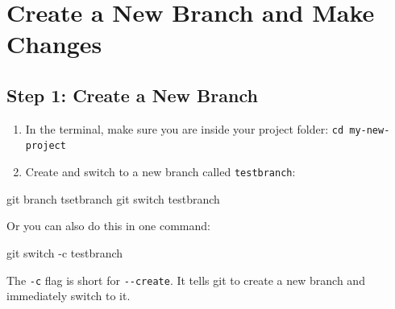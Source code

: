 \documentclass[
  11pt,
  letterpaper,
  DIV=11,
  numbers=noendperiod]{scrartcl}
\newenvironment{Shaded}{\begin{snugshade}}{\end{snugshade}}
\newcommand{\AttributeTok}[1]{\textcolor[rgb]{0.40,0.45,0.13}{#1}}
\newcommand{\FunctionTok}[1]{\textcolor[rgb]{0.28,0.35,0.67}{#1}}
\newcommand{\NormalTok}[1]{\textcolor[rgb]{0.00,0.23,0.31}{#1}}
\providecommand{\tightlist}{%
  \setlength{\itemsep}{0pt}\setlength{\parskip}{0pt}}\usepackage{longtable,booktabs,array}
\let\textttOrig\texttt
\renewcommand{\texttt}[1]{\textttOrig{\colorbox{codebggray}{\textcolor{codefontcolor}{#1}}}}
\begin{document}
\newpage

\section{Create a New Branch and Make
Changes}\label{create-a-new-branch-and-make-changes}

\subsection{Step 1: Create a New
Branch}\label{step-1-create-a-new-branch}

\begin{enumerate}
\def\labelenumi{\arabic{enumi}.}
\tightlist
\item
  In the terminal, make sure you are inside your project folder:
  \texttt{cd\ my-new-project}
\item
  Create and switch to a new branch called \texttt{testbranch}:
\end{enumerate}

\begin{Shaded}
\begin{Highlighting}[]
\FunctionTok{git}\NormalTok{ branch tsetbranch}
\FunctionTok{git}\NormalTok{ switch testbranch}
\end{Highlighting}
\end{Shaded}

Or you can also do this in one command:

\begin{Shaded}
\begin{Highlighting}[]
\FunctionTok{git}\NormalTok{ switch }\AttributeTok{{-}c}\NormalTok{ testbranch}
\end{Highlighting}
\end{Shaded}

\begin{tcolorbox}[enhanced jigsaw, opacityback=0, coltitle=black, bottomrule=.15mm, opacitybacktitle=0.6, breakable, colbacktitle=quarto-callout-tip-color!10!white, title=\textcolor{quarto-callout-tip-color}{\faLightbulb}\hspace{0.5em}{Tip}, left=2mm, rightrule=.15mm, toprule=.15mm, leftrule=.75mm, bottomtitle=1mm, toptitle=1mm, colback=white, titlerule=0mm, arc=.35mm, colframe=quarto-callout-tip-color-frame]

The \texttt{-c} flag is short for \texttt{-\/-create}. It tells git to
create a new branch and immediately switch to it.

\end{tcolorbox}
\end{document}
